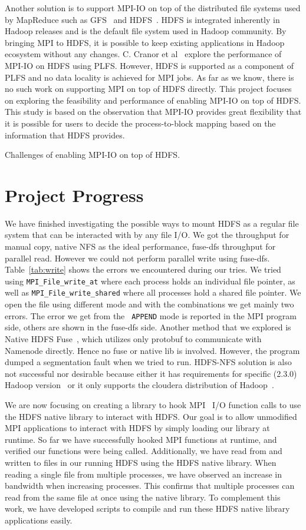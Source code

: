 \documentclass[11pt,titlepage]{article}
\begin{document}
Another solution is to support MPI-IO on top of the distributed file systems
used by MapReduce such as GFS~\cite{} and HDFS~\cite{hdfs}. HDFS is integrated
inherently in Hadoop releases and is the default file system used in Hadoop
community. By bringing MPI to HDFS, it is possible to keep existing applications
in Hadoop ecosystem without any changes. C. Cranor et al~\cite{} explore the
performance of MPI-IO on HDFS using PLFS. However, HDFS is supported as a
component of PLFS and no data locality is achieved for MPI jobs. As far as we
know, there is no such work on supporting MPI on top of HDFS directly. This
project focuses on exploring the feasibility and performance of enabling MPI-IO
on top of HDFS. This study is based on the observation that MPI-IO provides
great flexibility that it is possible for users to decide the process-to-block
mapping based on the information that HDFS provides. 

{\color{blue}Challenges of enabling MPI-IO on top of HDFS.}

\section{Project Progress}
We have finished investigating the possible ways to mount HDFS as a regular
file system that can be interacted with by any file I/O. 
We got the throughput for manual copy, native NFS as the ideal performance,
fuse-dfs throughput for parallel read. However we could not perform parallel
write using fuse-dfs. Table~\ref{tab:write} shows the errors we encountered during our
tries. We tried using {\tt MPI\_File\_write\_at} where each process holds an
individual file pointer, as well as {\tt MPI\_File\_write\_shared} where all
processes hold a shared file pointer. We open the file using different mode and
with the combinations we get mainly two errors. The error we get from the {\tt
APPEND} mode is reported in the MPI program side, others are shown in the
fuse-dfs side. Another method that we explored is Native HDFS Fuse~\cite{native},
which utilizes only protobuf to communicate with Namenode directly. Hence no
fuse or native lib is involved. However, the program dumped a segmentation fault
when we tried to run. HDFS-NFS solution is also not successful nor
desirable because either it has requirements for specific (2.3.0) Hadoop
version~\cite{nfs} or it only supports the cloudera distribution of
Hadoop~\cite{proxy}.


We are now focusing on creating a library to 
hook MPI~\cite{mpich} I/O function calls to use the HDFS native library to interact with
HDFS. Our goal is to allow 
unmodified MPI applications to interact with HDFS by simply loading our library
at runtime. 
So far we have successfully hooked MPI functions at runtime, and verified our
functions were being 
called. Additionally, we have read from and written to files in our running HDFS
using the HDFS native 
library. When reading a single file from multiple processes, we have observed an
increase in bandwidth 
when increasing processes. This confirms that multiple processes can read from the
same file at once using 
the native library. To complement this work, we have developed scripts to
compile and run these HDFS 
native library applications easily.
\end{document}

